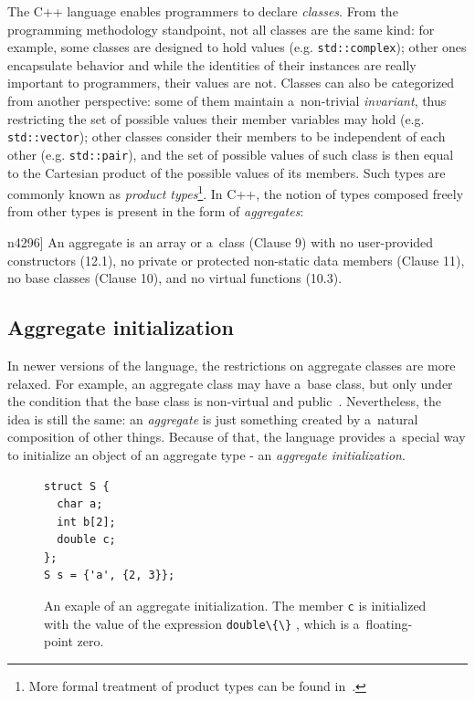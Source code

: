 \documentclass[nolot,nolof,nocover,printed]{fithesis3}
\newcommand{\stdN}[2]{\cite[#2]{#1}\xspace}
\begin{document}
The C++ language enables programmers to declare \textit{classes}. From the programming methodology standpoint, not all classes are the same kind: for example, some classes are designed to hold values (e.g. \lstinline|std::complex|); other ones encapsulate behavior and while the identities of their instances are really important to programmers, their values are not. Classes can also be categorized from another perspective: some of them maintain a~non-trivial \textit{invariant}, thus restricting the set of possible values their member variables may hold (e.g. \lstinline|std::vector|); other classes consider their members to be independent of each other (e.g. \lstinline|std::pair|), and the set of possible values of such class is then equal to the Cartesian product of the possible values of its members. Such types are commonly known as \textit{product types}\footnote{More formal treatment of product types can be found in~\cite[Chapter~1.5]{hottbook}.}. In C++, the notion of types composed freely from other types is present in the form of \textit{aggregates}:
\begin{displayquote}[\stdN{n4296}{\S 8.5.1/1}]
An aggregate is an array or a~class (Clause 9) with no user-provided constructors (12.1), no private or
protected non-static data members (Clause 11), no base classes (Clause 10), and no virtual functions (10.3).
\end{displayquote}

\subsection{Aggregate initialization}
In newer versions of the language, the restrictions on aggregate classes are more relaxed. For example, an aggregate class may have a~base class, but only under the condition that the base class is non-virtual and public~\stdN{n4700}{\S 11.6.1/1}. Nevertheless, the idea is still the same: an \textit{aggregate} is just something created by a~natural composition of other things. Because of that, the language provides a~special way to initialize an object of an aggregate type - an \textit{aggregate initialization}.

\begin{figure}[ht]
\begin{lstlisting}
struct S {
  char a;
  int b[2];
  double c;
};
S s = {'a', {2, 3}};
\end{lstlisting}
\caption[Aggregate initialization.]{An exaple of an aggregate initialization. The member \lstinline|c| is initialized with the value of the expression \lstinline|double\{\}| , which is a~floating-point zero.}
\label{fig:aggrInit}
\end{figure}
\end{document}
